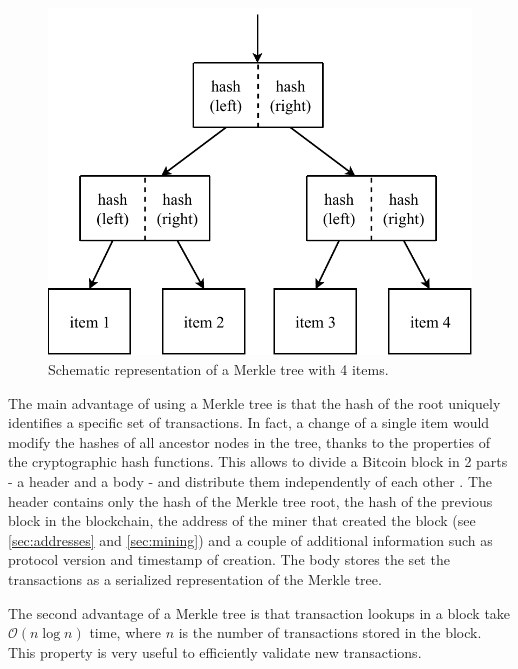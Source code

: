 \begin{figure}[h]
	\centering
	\vspace*{0.1cm}
	\includegraphics[scale=0.7]{figures/merkle}
	\vspace*{0.25cm}
	\caption{Schematic representation of a Merkle tree with \num{4} items.}
	\label{fig:merkle}
\end{figure}

The main advantage of using a Merkle tree is that the hash of the root uniquely identifies a specific set of transactions.
In fact, a change of a single item would modify the hashes of all ancestor nodes in the tree, thanks to the properties of the cryptographic hash functions.
This allows to divide a Bitcoin block in \num{2} parts - a header and a body - and distribute them independently of each other \cite{bitcoin_reference}.
The header contains only the hash of the Merkle tree root, the hash of the previous block in the blockchain, the address of the miner that created the block (see \cref{sec:addresses} and \cref{sec:mining}) and a couple of additional information such as protocol version and timestamp of creation.
The body stores the set the transactions as a serialized representation of the Merkle tree.

The second advantage of a Merkle tree is that transaction lookups in a block take $\mathcal{O}(n\log n)$ time, where $n$ is the number of transactions stored in the block.
This property is very useful to efficiently validate new transactions.

